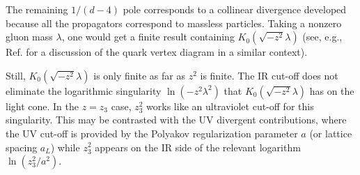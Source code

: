 The remaining $1/(d-4)$ pole
corresponds to a collinear divergence
developed
because all the propagators correspond to massless particles.
Taking a nonzero gluon mass $\lambda$, one would get a finite result
containing $K_0(\sqrt{-z^2} \lambda)$
(see, e.g., Ref. \cite{Radyushkin:2017lvu} for a discussion of
the quark vertex diagram in a similar context).

Still, $K_0(\sqrt{-z^2} \lambda)$ is only finite as far as $z^2$ is finite.
The IR cut-off does not eliminate
the logarithmic singularity $\ln (-z^2 \lambda^2)$ that
$K_0(\sqrt{-z^2} \lambda)$ has on the light cone.
In the $z=z_3$ case,
$z_3^2$ works like an ultraviolet cut-off
for this singularity.
This may be contrasted with the UV divergent contributions,
where the UV cut-off is provided by the Polyakov regularization parameter $a$
(or lattice spacing $a_L$) while $z_3^2$ appears on the IR side
of the relevant logarithm $\ln (z_3^2/a^2)$.
